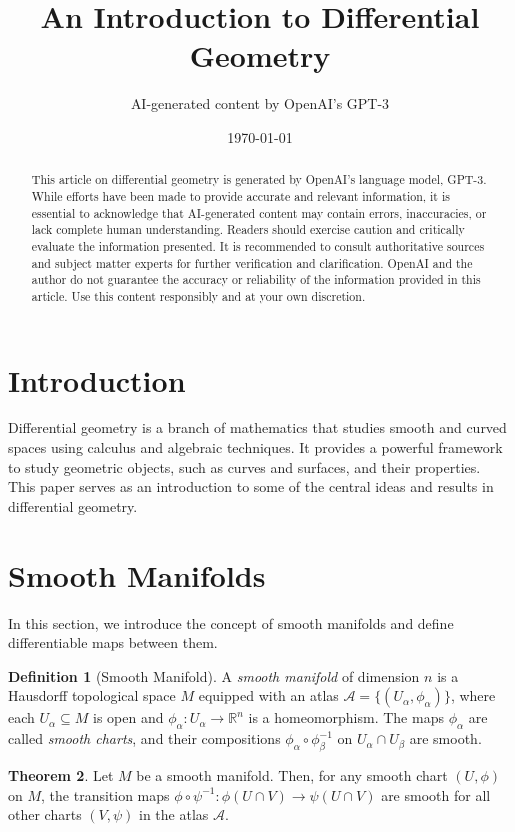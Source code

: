 \documentclass{article}
\title{An Introduction to Differential Geometry}
\author{AI-generated content by OpenAI's GPT-3}
\date{\today}
\theoremstyle{definition}
\newtheorem{definition}{Definition}[section]
\newtheorem{theorem}[definition]{Theorem}
\numberwithin{equation}{section}
\begin{document}
\maketitle

\begin{abstract}
This article on differential geometry is generated by OpenAI's language model, GPT-3. While efforts have been made to provide accurate and relevant information, it is essential to acknowledge that AI-generated content may contain errors, inaccuracies, or lack complete human understanding. Readers should exercise caution and critically evaluate the information presented. It is recommended to consult authoritative sources and subject matter experts for further verification and clarification. OpenAI and the author do not guarantee the accuracy or reliability of the information provided in this article. Use this content responsibly and at your own discretion.
\end{abstract}

\section{Introduction}
Differential geometry is a branch of mathematics that studies smooth and curved spaces using calculus and algebraic techniques. It provides a powerful framework to study geometric objects, such as curves and surfaces, and their properties. This paper serves as an introduction to some of the central ideas and results in differential geometry.

\section{Smooth Manifolds}
In this section, we introduce the concept of smooth manifolds and define differentiable maps between them.

\begin{definition}[Smooth Manifold]
A \textit{smooth manifold} of dimension $n$ is a Hausdorff topological space $M$ equipped with an atlas $\mathcal{A} = \{(U_\alpha, \phi_\alpha)\}$, where each $U_\alpha \subseteq M$ is open and $\phi_\alpha: U_\alpha \to \mathbb{R}^n$ is a homeomorphism. The maps $\phi_\alpha$ are called \textit{smooth charts}, and their compositions $\phi_\alpha \circ \phi_\beta^{-1}$ on $U_\alpha \cap U_\beta$ are smooth.
\end{definition}

\begin{theorem}
Let $M$ be a smooth manifold. Then, for any smooth chart $(U, \phi)$ on $M$, the transition maps $\phi \circ \psi^{-1}: \phi(U \cap V) \to \psi(U \cap V)$ are smooth for all other charts $(V, \psi)$ in the atlas $\mathcal{A}$.
\end{theorem}
\end{document}
